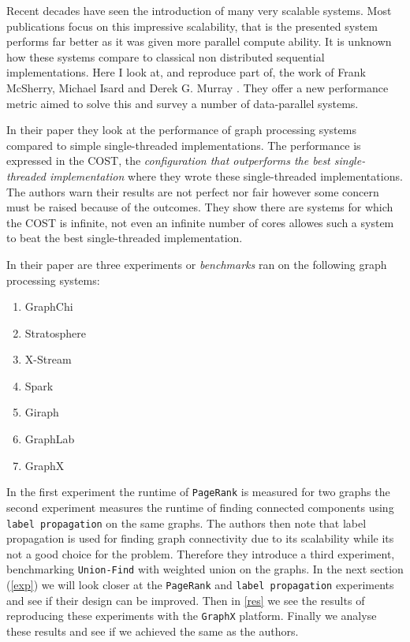 Recent decades have seen the introduction of many very scalable systems. Most publications focus on this impressive scalability, that is the presented system performs far better as it was given more parallel compute ability. It is unknown how these systems compare to classical non distributed sequential implementations. Here I look at, and reproduce part of, the work of Frank McSherry, Michael Isard and Derek G. Murray \cite{189908}. They offer a new performance metric aimed to solve this and survey a number of data-parallel systems.

In their paper they look at the performance of graph processing systems compared to simple single-threaded implementations. The performance is expressed in the COST, the \textit{configuration that outperforms the best single-threaded implementation} where they wrote these single-threaded implementations. The authors warn their results are not perfect nor fair however some concern must be raised because of the outcomes. They show there are systems for which the COST is infinite, not even an infinite number of cores allowes such a system to beat the best single-threaded implementation.
 
In their paper are three experiments or \textit{benchmarks} ran on the following graph processing systems:

\begin{multicols}{2}
\begin{enumerate}
	\item GraphChi 
	\item Stratosphere
	\item X-Stream
	\item Spark
	\item Giraph
	\item GraphLab
	\item GraphX
\end{enumerate}
\end{multicols}

In the first experiment the runtime of \texttt{PageRank} is measured for two graphs the second experiment measures the runtime of finding connected components using \texttt{label propagation} on the same graphs. The authors then note that label propagation is used for finding graph connectivity due to its scalability while its not a good choice for the problem. Therefore they introduce a third experiment, benchmarking \texttt{Union-Find} with weighted union on the graphs. In the next section (\cref{exp}) we will look closer at the \texttt{PageRank} and \texttt{label propagation} experiments and see if their design can be improved. Then in \cref{res} we see the results of reproducing these experiments with the \texttt{GraphX} platform. Finally we analyse these results and see if we achieved the same as the authors.
